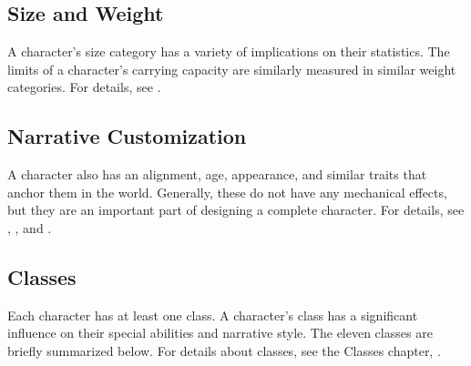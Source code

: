     \subsection{Size and Weight}
        A character's size category has a variety of implications on their statistics.
        The limits of a character's carrying capacity are similarly measured in similar weight categories.
        For details, see .

    \subsection{Narrative Customization}
        A character also has an alignment, age, appearance, and similar traits that anchor them in the world.
        Generally, these do not have any mechanical effects, but they are an important part of designing a complete character.
        For details, see , , and .

    \subsection{Classes}
        Each character has at least one class.
        A character's class has a significant influence on their special abilities and narrative style.
        The eleven classes are briefly summarized below.
        For details about classes, see the Classes chapter, .

